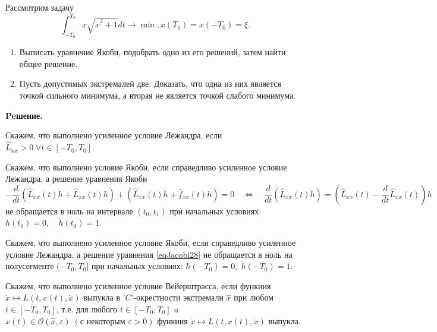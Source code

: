 \begin{task}
    Рассмотрим задачу
    \begin{equation*}
        \int_{-T_0}^{T_0} x \sqrt{\dot{x}^2+1} d t \rightarrow \min , 
        x\left(T_0\right) = x \left( -T_0 \right) = \xi.
    \end{equation*}
    \begin{enumerate}
        \item Выписать уравнение Якоби, подобрать одно из его решений, 
        затем найти общее решение. 
        \item Пусть допустимых экстремалей две. Доказать, что одна из них 
        является точкой сильного минимума, а вторая не является точкой слабого минимума.
    \end{enumerate}


    \textbf{Peшение.} 
    \begin{definition}
        Скажем, что выполнено усиленное условие Лежандра, 
        если $\widehat L_{\dot{x}\dot{x}} > 0 \; \forall t \in [-T_0, T_0]$.
    \end{definition}

    \begin{definition} Скажем, что выполнено условие Якоби, 
        если справедливо усиленное условие Лежандра, а решение уравнения Якоби
        \begin{equation} \label{eqJacobi28} 
            -\frac{d}{d t}\left(\widehat{L}_{\dot{x} \dot{x}}(t) \dot{h}
                +\widehat{L}_{\dot{x} x}(t) h\right)
                +\left(\widehat{L}_{\dot{x} x}(t) \dot{h}
                +\widehat{f}_{x x}(t) h\right)=0 \quad 
                \Leftrightarrow \quad \frac{d}{d t}\left(\widehat{L}_{\dot{x} \dot{x}}(t) \dot{h}\right)
                =\left(\widehat{L}_{x x}(t)-\frac{d}{d t} \widehat{L}_{\dot{x} x}(t)\right) h
        \end{equation}
        не обращается в ноль на интервале $\left(t_0, t_1\right)$ при начальных условиях: 
        $h\left(t_0\right)=0, \quad \dot{h}\left(t_0\right)=1$. 
    \end{definition}
    \begin{definition}
        Скажем, что выполнено усиленное условие Якоби, если справедливо усиленное условие 
        Лежандра, а решение уравнения \eqref{eqJacobi28} не обращается в ноль на полусегменте
        $(-T_0, T_0]$ при начальных условиях: ${h(-T_0)=0, \; \dot{h}(-T_0)=1}$.
    \end{definition}

    \begin{definition}
        Скажем, что выполнено усиленное условие Вейерштрасса, 
        если функиия $\dot{x} \mapsto L(t, x(t), \dot{x})$ 
        выпукла в '$C$'-окрестности экстремали $\widehat{x}$ 
        при любом $t \in\left[-T_0, T_0\right]$, т.е. для любого 
        $t \in\left[-T_0, T_0\right]$ u $x(t) \in 
        \mathcal{O}(\widehat{x}, \varepsilon) \;
        (\text {с некоторым } {\varepsilon>0})$ функиия
        $\dot{x} \mapsto L(t, x(t), \dot{x})$ выпукла.
    \end{definition}


\end{task}
